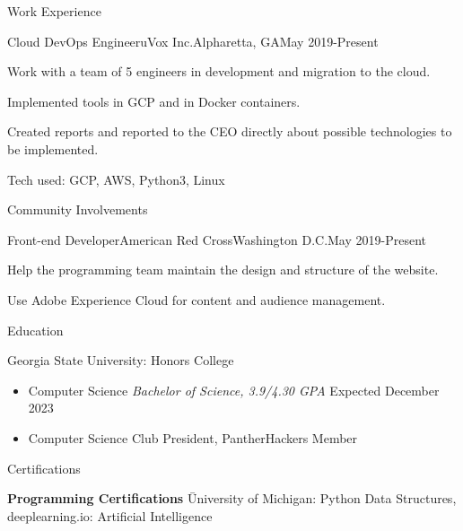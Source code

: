 \documentclass{article}
\newlength{\tabin}
\newlength{\secsep}
\newcommand{\lineunder}{\vspace*{-8pt} \\ \hspace*{-6pt} \hrulefill \\ \vspace*{-15pt}}
\newenvironment{tabbedsection}[1]{
  \begin{list}{}{
      \setlength{\itemsep}{0pt}
      \setlength{\labelsep}{0pt}
      \setlength{\labelwidth}{0pt}
      \setlength{\leftmargin}{\tabin}
      \setlength{\rightmargin}{\tabin}
      \setlength{\listparindent}{0pt}
      \setlength{\parsep}{0pt}
      \setlength{\parskip}{0pt}
      \setlength{\partopsep}{0pt}
      \setlength{\topsep}{#1}
    }
  \item[]
}{\end{list}}
\newenvironment{nospacetabbing}{
    \begin{tabbing}
}{\end{tabbing}\vspace{-1.2em}}
\newenvironment{resume_section}[1]{
  \filbreak
  \vspace{2\secsep}
  \textsc{\large#1}
  \lineunder
  \begin{tabbedsection}{\secsep}
}{\end{tabbedsection}}
\newenvironment{resume_subsection}[2][]{
  \textbf{#2} \hfill {\footnotesize #1} \hspace{2em}
  \begin{tabbedsection}{0.5\secsep}
}{\end{tabbedsection}}
\newenvironment{subitems}{
  \renewcommand{\labelitemi}{-}
  \begin{itemize}
      \setlength{\labelsep}{1em}
}{\end{itemize}}
\newenvironment{resume_employer}[4]{
  \vspace{\secsep}
  \textbf{#1} \\ 
  \indent {\small #2} \hfill {\footnotesize#3 (#4)}
  \begin{tabbedsection}{0pt}
  \begin{subitems}
}{\end{subitems}\end{tabbedsection}}
\begin{document}
\begin{resume_section}{Work Experience}
 
    
    
  \begin{resume_employer}{Cloud DevOps Engineer}{uVox Inc.}{Alpharetta, GA}{May 2019-Present}
\item Work with a team of 5 engineers in development and migration to the cloud.
\item Implemented tools in GCP and in Docker containers.
\item Created reports and reported to the CEO directly about possible technologies to be implemented.

\item Tech used: GCP, AWS, Python3, Linux
    \end{resume_employer}
   
  


 


  
\end{resume_section}
\begin{resume_section}{Community Involvements}
 \begin{resume_employer}   {Front-end Developer}{American Red Cross}{Washington D.C.}{May 2019-Present}
    \item Help the programming team maintain the design and structure of the website.
    \item Use Adobe Experience Cloud for content and audience management.
  \end{resume_employer}



\end{resume_section}


\begin{resume_section}{Education}
  \begin{resume_subsection}{Georgia State University: Honors College }
    \begin{subitems}
       \item Computer Science \textit{Bachelor of Science, 3.9/4.30 GPA }  Expected December 2023
       \item Computer Science Club President, PantherHackers Member
    \end{subitems}
  \end{resume_subsection}

\end{resume_section}

\begin{resume_section}{Certifications}
  \begin{nospacetabbing}

  \textbf{Programming Certifications}  \= University of Michigan: Python Data Structures, deeplearning.io: Artificial Intelligence
  \end{nospacetabbing}
\end{resume_section}
\end{document}
